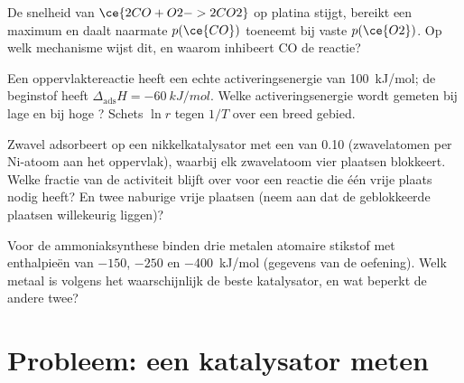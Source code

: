 \begin{exercise}[$\star\star$]\label{exo:b3:surfaces-catalysis:9}
De snelheid van $\ce{2 CO + O2 -> 2 CO2}$ op platina stijgt, bereikt een
maximum en daalt naarmate $p(\ce{CO})$ toeneemt bij vaste $p(\ce{O2})$. Op
welk mechanisme wijst dit, en waarom inhibeert CO de reactie?
\end{exercise}

\begin{exercise}[$\star\star\star$]\label{exo:b3:surfaces-catalysis:10}
Een oppervlaktereactie heeft een echte activeringsenergie van
\qty{100}{kJ/mol}; de beginstof heeft
$\Delta_{\mathrm{ads}}H = \qty{-60}{kJ/mol}$. Welke activeringsenergie wordt
gemeten bij lage en bij hoge ? Schets $\ln r$ tegen $1/T$
over een breed gebied.
\end{exercise}

\begin{exercise}[$\star\star\star$]\label{exo:b3:surfaces-catalysis:11}
Zwavel adsorbeert op een nikkelkatalysator met een  van
0.10 (zwavelatomen per Ni-atoom aan het oppervlak), waarbij elk
zwavelatoom vier plaatsen blokkeert. Welke fractie van de activiteit
blijft over voor een reactie die één vrije plaats nodig heeft? En twee
naburige vrije plaatsen (neem aan dat de geblokkeerde plaatsen
willekeurig liggen)?
\end{exercise}

\begin{exercise}[$\star\star\star$]\label{exo:b3:surfaces-catalysis:12}
Voor de ammoniaksynthese binden drie metalen atomaire stikstof met
enthalpieën van
$-150$, $-250$ en \qty{-400}{kJ/mol} (gegevens van de oefening). Welk
metaal is volgens het  waarschijnlijk de beste
katalysator, en wat beperkt de andere twee?
\end{exercise}

\section{Probleem: een katalysator meten}

